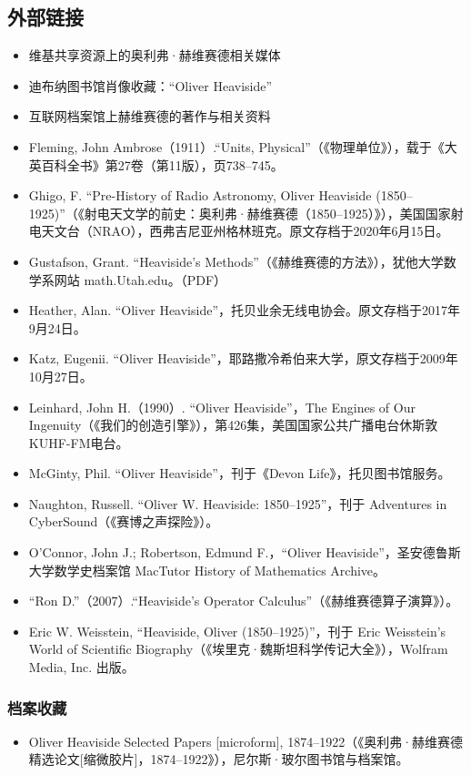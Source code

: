 \subsection{外部链接}
\begin{itemize}
\item 维基共享资源上的奥利弗·赫维赛德相关媒体
\item 迪布纳图书馆肖像收藏：“Oliver Heaviside”
\item 互联网档案馆上赫维赛德的著作与相关资料
\item Fleming, John Ambrose（1911）.“Units, Physical”（《物理单位》），载于《大英百科全书》第27卷（第11版），页738–745。
\item Ghigo, F. “Pre-History of Radio Astronomy, Oliver Heaviside (1850–1925)”（《射电天文学的前史：奥利弗·赫维赛德（1850–1925）》），美国国家射电天文台（NRAO），西弗吉尼亚州格林班克。原文存档于2020年6月15日。
\item Gustafson, Grant. “Heaviside’s Methods”（《赫维赛德的方法》），犹他大学数学系网站 math.Utah.edu。（PDF）
\item Heather, Alan. “Oliver Heaviside”，托贝业余无线电协会。原文存档于2017年9月24日。
\item Katz, Eugenii. “Oliver Heaviside”，耶路撒冷希伯来大学，原文存档于2009年10月27日。
\item Leinhard, John H.（1990）. “Oliver Heaviside”，The Engines of Our Ingenuity（《我们的创造引擎》），第426集，美国国家公共广播电台休斯敦KUHF-FM电台。
\item McGinty, Phil. “Oliver Heaviside”，刊于《Devon Life》，托贝图书馆服务。
\item Naughton, Russell. “Oliver W. Heaviside: 1850–1925”，刊于 Adventures in CyberSound（《赛博之声探险》）。
\item O’Connor, John J.; Robertson, Edmund F.，“Oliver Heaviside”，圣安德鲁斯大学数学史档案馆 MacTutor History of Mathematics Archive。
\item “Ron D.”（2007）.“Heaviside’s Operator Calculus”（《赫维赛德算子演算》）。
\item Eric W. Weisstein, “Heaviside, Oliver (1850–1925)”，刊于 Eric Weisstein’s World of Scientific Biography（《埃里克·魏斯坦科学传记大全》），Wolfram Media, Inc. 出版。
\end{itemize}
\subsubsection{档案收藏}
\begin{itemize}
\item Oliver Heaviside Selected Papers [microform], 1874–1922（《奥利弗·赫维赛德精选论文[缩微胶片]，1874–1922》），尼尔斯·玻尔图书馆与档案馆。
\end{itemize}